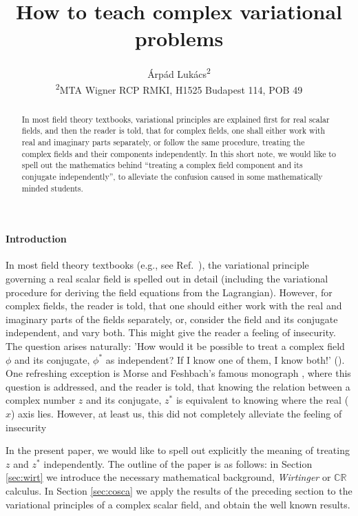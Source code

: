 \documentclass[a4paper,11pt]{article}
\title{How to teach complex variational problems}
\author{Árpád Lukács\textsuperscript{2}\\
{\small {}\textsuperscript{2}MTA Wigner RCP RMKI, H1525 Budapest 114, POB 49}}
\begin{document}
\maketitle

\begin{abstract}
In most field theory textbooks, variational principles are explained first for real scalar fields, and then the reader is told, that for complex fields,
one shall either work with real and imaginary parts separately, or follow the same procedure, treating the complex fields and their components independently.
In this short note, we would like to spell out the mathematics behind ``treating a complex field component and its conjugate independently'', to alleviate the confusion caused
in some mathematically minded students.
\end{abstract}

\paragraph{Introduction}
In most field theory textbooks (e.g., see Ref.\ \cite{PS}), the variational principle governing a real scalar field is spelled out in detail (including the variational procedure
for deriving the field equations from the Lagrangian). However, for complex fields, the reader is told, that one should either work with the real and imaginary parts of the fields separately,
or, consider the field and its conjugate independent, and vary both. This might give the reader a feeling of insecurity. The question arises naturally: 'How would it be possible to treat a complex
field $\phi$ and its conjugate, $\phi^*$ as independent? If I know one of them, I know both!' (\cite{MF}). One refreshing exception is Morse and Feshbach's famous monograph \cite{MF}, where this question
is addressed, and the reader is told, that knowing the relation between a complex number $z$ and its conjugate, $z^*$ is equivalent to knowing where the real ($x$) axis lies.
However, at least us, this did not completely alleviate the feeling of insecurity

In the present paper, we would like to spell out explicitly the meaning of treating $z$ and $z^*$ independently. The outline of the paper is as follows: in Section \ref{sec:wirt} we introduce the necessary
mathematical background, {\sl Wirtinger} or $\mathbb{CR}$ calculus. In Section \ref{sec:cosca} we apply the results of the preceding section to the variational principles of a complex scalar field,
and obtain the well known results. %
\end{document}
